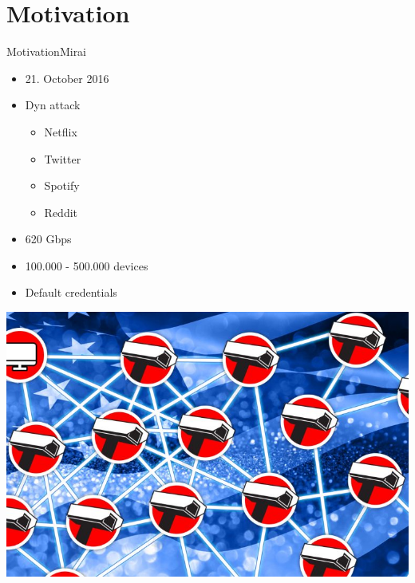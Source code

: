 \section{Motivation}
\begin{frame}{Motivation}{Mirai}


\begin{minipage}{0.48\textwidth}
\begin{itemize}
	\item 21. October 2016
	\item Dyn attack 
	\begin{itemize}
		\item Netflix
		\item Twitter
		\item Spotify
		\item Reddit
	\end{itemize}
	\item 620 Gbps
	\item 100.000 - 500.000 devices
	\item Default credentials
	
\end{itemize}
\end{minipage}
\hfill
\begin{minipage}{0.48\textwidth}
\vspace{0.4\textheight}
	\includegraphics[width=\textwidth]{figs/botnet}
\end{minipage}
\end{frame}
